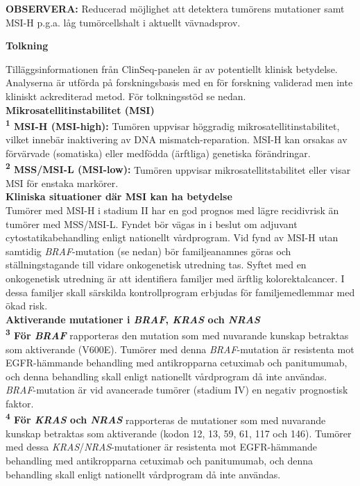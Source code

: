 \documentclass[10pt]{article}
\begin{document}
\vspace{0.3cm}

  \textbf{OBSERVERA:} {\small Reducerad möjlighet att detektera tumörens mutationer samt MSI-H p.g.a. låg tumörcellshalt i aktuellt vävnadsprov.}

  \vspace{0.3cm}

\textbf{Tolkning} \par
{\small
Tilläggsinformationen från ClinSeq-panelen är av potentiellt klinisk betydelse. Analyserna är utförda på forskningsbasis med en för forskning validerad men inte kliniskt ackrediterad metod. För tolkningsstöd se nedan. \\

\textbf{Mikrosatellitinstabilitet (MSI)}\\
\textbf{\textsuperscript{1} MSI-H (MSI-high):} Tumören uppvisar höggradig mikrosatellitinstabilitet, vilket innebär inaktivering av DNA mismatch-reparation. MSI-H kan orsakas av förvärvade (somatiska) eller medfödda (ärftliga) genetiska förändringar. \\
\textbf{\textsuperscript{2} MSS/MSI-L (MSI-low):} Tumören uppvisar mikrosatellitstabilitet eller visar MSI för enstaka markörer. \\

\textbf{Kliniska situationer där MSI kan ha betydelse}\\
Tumörer med MSI-H i stadium II har en god prognos med lägre recidivrisk än tumörer med MSS/MSI-L. Fyndet bör vägas in i beslut om adjuvant cytostatikabehandling enligt nationellt vårdprogram. Vid fynd av MSI-H utan samtidig \textit{BRAF}-mutation (se nedan) bör familjeanamnes göras och ställningstagande till vidare onkogenetisk utredning tas. Syftet med en onkogenetisk utredning är att identifiera familjer med ärftlig kolorektalcancer. I dessa familjer skall särskilda kontrollprogram erbjudas för familjemedlemmar med ökad risk. \\

\textbf{Aktiverande mutationer i \textit{BRAF}, \textit{KRAS} och \textit{NRAS}}\\
\textbf{\textsuperscript{3} För \textit{BRAF}} rapporteras den mutation som med nuvarande kunskap betraktas som aktiverande (V600E). Tumörer med denna \textit{BRAF}-mutation är resistenta mot EGFR-hämmande behandling med antikropparna cetuximab och panitumumab, och denna behandling skall enligt nationellt vårdprogram då inte användas. \textit{BRAF}-mutation är vid avancerade tumörer (stadium IV) en negativ prognostisk faktor. \\
\textbf{\textsuperscript{4} För \textit{KRAS} och \textit{NRAS}} rapporteras de mutationer som med nuvarande kunskap betraktas som aktiverande (kodon 12, 13, 59, 61, 117 och 146). Tumörer med dessa \textit{KRAS}/\textit{NRAS}-mutationer är resistenta mot EGFR-hämmande behandling med antikropparna cetuximab och panitumumab, och denna behandling skall enligt nationellt vårdprogram då inte användas. \\
}
\par

\end{document}
